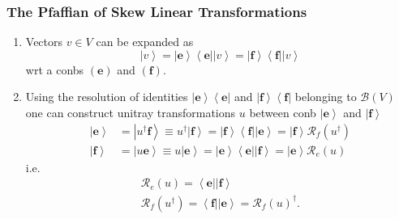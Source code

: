 \documentclass[aps,preprint]{revtex4}%
\begin{document}
\subsubsection{The Pfaffian of Skew Linear Transformations
\label{The Pfaffian of Skew Linear Transformations}}

\begin{enumerate}
\item Vectors $v\in V$ can be expanded as
\begin{equation}
\left\vert v\right\rangle =\left\vert \mathbf{e}\right\rangle \left\langle
\mathbf{e}\right\vert \left\vert v\right\rangle =\left\vert \mathbf{f}%
\right\rangle \left\langle \mathbf{f}\right\vert \left\vert v\right\rangle
\end{equation}
wrt a conbs $\left(  \mathbf{e}\right)  $ and $\left(  \mathbf{f}\right)  .$

\item Using the resolution of identities $\left\vert \mathbf{e}\right\rangle
\left\langle \mathbf{e}\right\vert $ and $\left\vert \mathbf{f}\right\rangle
\left\langle \mathbf{f}\right\vert $ belonging to $\mathcal{B}\left(
V\right)  $ one can construct unitray transformations $u$ between conb
$\left\vert \mathbf{e}\right\rangle $ and $\left\vert \mathbf{f}\right\rangle
$
\begin{align}
\left\vert \mathbf{e}\right\rangle  &  =\left\vert u^{\dagger}\mathbf{f}%
\right\rangle \equiv u^{\dagger}\left\vert \mathbf{f}\right\rangle =\left\vert
\mathbf{f}\right\rangle \left\langle \mathbf{f}\right\vert \left\vert
\mathbf{e}\right\rangle =\left\vert \mathbf{f}\right\rangle \mathcal{R}%
_{f}\left(  u^{\dagger}\right) \\
\left\vert \mathbf{f}\right\rangle  &  =\left\vert u\mathbf{e}\right\rangle
\equiv u\left\vert \mathbf{e}\right\rangle =\left\vert \mathbf{e}\right\rangle
\left\langle \mathbf{e}\right\vert \left\vert \mathbf{f}\right\rangle
=\left\vert \mathbf{e}\right\rangle \mathcal{R}_{e}\left(  u\right)
\end{align}
i.e.%
\begin{gather}
\mathcal{R}_{e}\left(  u\right)  =\left\langle \mathbf{e}\right\vert
\left\vert \mathbf{f}\right\rangle \\
\mathcal{R}_{f}\left(  u^{\dagger}\right)  =\left\langle \mathbf{f}\right\vert
\left\vert \mathbf{e}\right\rangle =\mathcal{R}_{f}\left(  u\right)
^{\dagger}.
\end{gather}



\end{enumerate}
\end{document}
